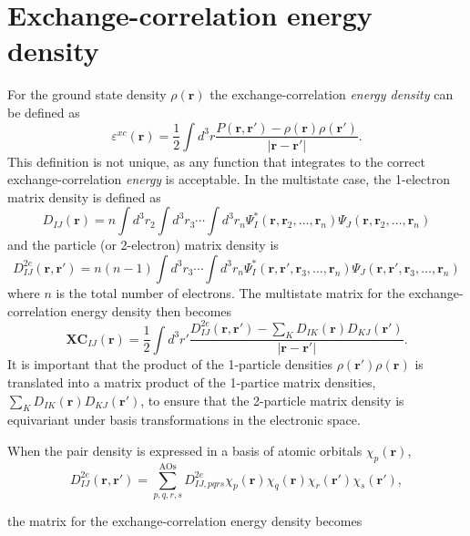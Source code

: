 \documentclass[journal=jacsat,manuscript=article]{achemso}
\renewcommand\vec[1]{\mathbf{#1}}
\begin{document}
\section{Exchange-correlation energy density}

For the ground state density $\rho(\vec{r})$ the exchange-correlation \emph{energy density} can be defined as
\begin{equation}
 \varepsilon^{xc}(\vec{r}) = \frac{1}{2} \int d^3r \frac{P(\vec{r},\vec{r}') - \rho(\vec{r}) \rho(\vec{r}')}{\vert \vec{r} - \vec{r}' \vert}.
\end{equation}
This definition is not unique, as any function that integrates to the correct exchange-correlation \emph{energy} is acceptable.
In the multistate case, the 1-electron matrix density is defined as
\begin{equation}
D_{IJ}(\vec{r}) = n \int d^3r_2 \int d^3r_3 \cdots \int d^3r_n
  \Psi^*_I(\vec{r},\vec{r}_2,\ldots,\vec{r}_n)
  \Psi_J(\vec{r},\vec{r}_2,\ldots,\vec{r}_n)
\end{equation}
and the particle (or 2-electron) matrix density is
\begin{equation}
D^{2e}_{IJ}(\vec{r},\vec{r}') = n (n-1) \int d^3r_3 \cdots \int d^3r_n 
  \Psi^*_I(\vec{r},\vec{r}',\vec{r}_3,\ldots,\vec{r}_n)
  \Psi_J(\vec{r},\vec{r}',\vec{r}_3,\ldots,\vec{r}_n)
\end{equation}
where $n$ is the total number of electrons.
The multistate matrix for the exchange-correlation energy density then becomes
\begin{equation}
\textbf{XC}_{IJ}(\vec{r}) =  \frac{1}{2} \int d^3r' \frac{
  D^{2e}_{IJ}(\vec{r},\vec{r}') - \sum_K D_{IK}(\vec{r}) D_{KJ}(\vec{r}')}{\vert \vec{r} - \vec{r}' \vert}.
\end{equation}
It is important that the product of the 1-particle densities $\rho(\vec{r}') \rho(\vec{r})$ is translated
into a matrix product of the 1-partice matrix densities, $\sum_K D_{IK}(\vec{r}) D_{KJ}(\vec{r}')$, to ensure
that the 2-particle matrix density is equivariant under basis transformations in the electronic space.

When the pair density is expressed in a basis of atomic orbitals $\chi_{p}(\vec{r})$,
\begin{equation}
D^{2e}_{IJ}(\vec{r},\vec{r}') = \sum_{p,q,r,s}^{\text{AOs}} D^{2e}_{IJ,pqrs} 
  \chi_p(\vec{r}) \chi_q(\vec{r}) \chi_r(\vec{r}') \chi_s(\vec{r}'),
\end{equation}

the matrix for the exchange-correlation energy density becomes
\end{document}
